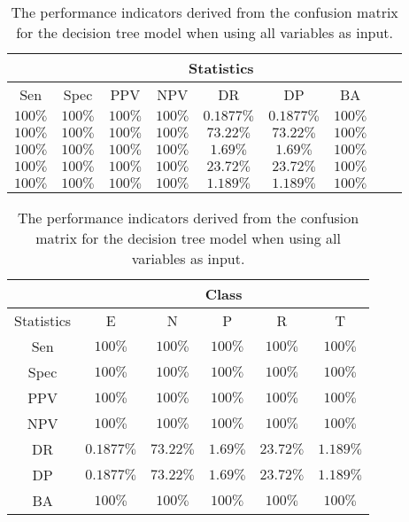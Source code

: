 \begin{table}[!ht]
	\centering
	\begin{tabular}{|c|c|c|c|c|c|c|c|c|}
		\hline
		 & \multicolumn{7}{c|}{Statistics} \\ \hline
		Sen & Spec & PPV & NPV & DR & DP & BA \\ \hline
		$100\%$ & $100\%$ & $100\%$ & $100\%$ & $0.1877\%$ & $0.1877\%$ & $100\%$ \\ \hline
		$100\%$ & $100\%$ & $100\%$ & $100\%$ & $73.22\%$ & $73.22\%$ & $100\%$ \\ \hline
		$100\%$ & $100\%$ & $100\%$ & $100\%$ & $1.69\%$ & $1.69\%$ & $100\%$ \\ \hline
		$100\%$ & $100\%$ & $100\%$ & $100\%$ & $23.72\%$ & $23.72\%$ & $100\%$ \\ \hline
		$100\%$ & $100\%$ & $100\%$ & $100\%$ & $1.189\%$ & $1.189\%$ & $100\%$ \\ \hline
	\end{tabular}
	\caption{The performance indicators derived from the confusion matrix for the decision tree model when using all variables as input.}
	\label{tab:cs:all:C5.0}
\end{table}

\begin{table}[!ht]
	\centering
	\begin{tabular}{|c|c|c|c|c|c|}
		\hline
		 & \multicolumn{5}{c|}{Class} \\ \hline
		Statistics & E & N & P & R & T \\ \hline
		Sen & $100\%$ & $100\%$ & $100\%$ & $100\%$ & $100\%$ \\ \hline
		Spec & $100\%$ & $100\%$ & $100\%$ & $100\%$ & $100\%$ \\ \hline
		PPV & $100\%$ & $100\%$ & $100\%$ & $100\%$ & $100\%$ \\ \hline
		NPV & $100\%$ & $100\%$ & $100\%$ & $100\%$ & $100\%$ \\ \hline
		DR & $0.1877\%$ & $73.22\%$ & $1.69\%$ & $23.72\%$ & $1.189\%$ \\ \hline
		DP & $0.1877\%$ & $73.22\%$ & $1.69\%$ & $23.72\%$ & $1.189\%$ \\ \hline
		BA & $100\%$ & $100\%$ & $100\%$ & $100\%$ & $100\%$ \\ \hline
	\end{tabular}
	\caption{The performance indicators derived from the confusion matrix for the decision tree model when using all variables as input.}
	\label{tab:cs:reverse:all:C5.0}
\end{table}


